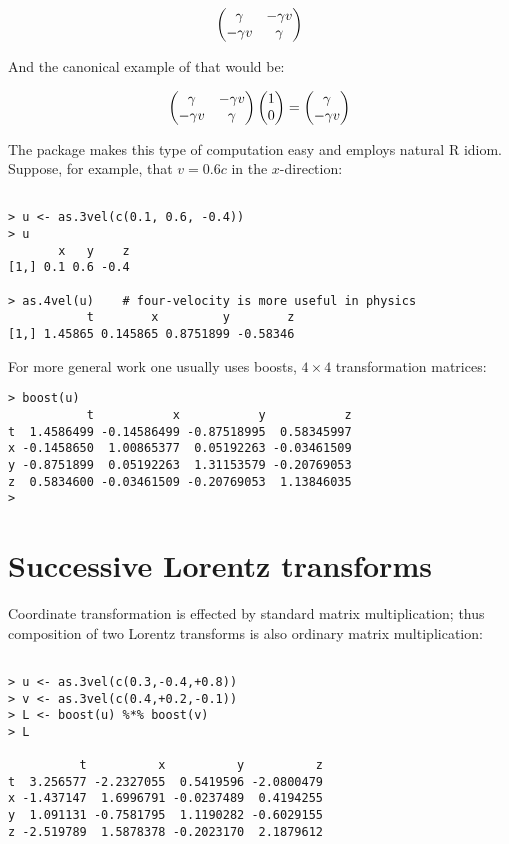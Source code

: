 \documentclass[ijoc,nonblindrev]{informs3} %
\begin{document}
\begin{equation*}
\begin{pmatrix} \gamma & -\gamma v \\ -\gamma v & \gamma\end{pmatrix}
\end{equation*}

And the canonical example of that would be:

\begin{equation*}
\begin{pmatrix} \gamma & -\gamma v \\ -\gamma
  v & \gamma\end{pmatrix}\begin{pmatrix}1 \\ 0\end{pmatrix}=\begin{pmatrix}\gamma \\ -\gamma v\end{pmatrix}
\end{equation*}

The package makes this type of computation easy and employs natural R
idiom.  Suppose, for example, that $v=0.6c$ in the $x$-direction:

\begin{verbatim}

> u <- as.3vel(c(0.1, 0.6, -0.4))
> u
       x   y    z
[1,] 0.1 0.6 -0.4

> as.4vel(u)    # four-velocity is more useful in physics
           t        x         y        z
[1,] 1.45865 0.145865 0.8751899 -0.58346

\end{verbatim}

For more general work one usually uses boosts, $4\times 4$
transformation matrices:

\begin{verbatim}
> boost(u) 
           t           x           y           z
t  1.4586499 -0.14586499 -0.87518995  0.58345997
x -0.1458650  1.00865377  0.05192263 -0.03461509
y -0.8751899  0.05192263  1.31153579 -0.20769053
z  0.5834600 -0.03461509 -0.20769053  1.13846035
> 

\end{verbatim}

\section{Successive Lorentz transforms}

Coordinate transformation is effected by standard matrix
multiplication; thus composition of two Lorentz transforms is also
ordinary matrix multiplication:

\begin{verbatim}

> u <- as.3vel(c(0.3,-0.4,+0.8))
> v <- as.3vel(c(0.4,+0.2,-0.1))
> L <- boost(u) %*% boost(v)
> L

          t          x          y          z
t  3.256577 -2.2327055  0.5419596 -2.0800479
x -1.437147  1.6996791 -0.0237489  0.4194255
y  1.091131 -0.7581795  1.1190282 -0.6029155
z -2.519789  1.5878378 -0.2023170  2.1879612

\end{verbatim}
\end{document}
